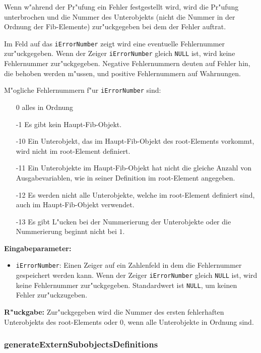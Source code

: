 Wenn w"ahrend der Pr"ufung ein Fehler festgestellt wird, wird die Pr"ufung unterbrochen und die Nummer des Unterobjekts (nicht die Nummer in der Ordnung der Fib-Elemente) zur"uckgegeben bei dem der Fehler auftrat.

Im Feld auf das \verb|iErrorNumber| zeigt wird eine eventuelle Fehlernummer zur"uckgegeben. Wenn der Zeiger \verb|iErrorNumber| gleich \verb|NULL| ist, wird keine Fehlernummer zur"uckgegeben. Negative Fehlernummern deuten auf Fehler hin, die behoben werden m"ussen, und positive Fehlernummern auf Wahrnungen.

\noindent
M"ogliche Fehlernummern f"ur \verb|iErrorNumber| sind:
\begin{itemize}
 \item [0] alles in Ordnung
 \item [-1] Es gibt kein Haupt-Fib-Objekt.
 \item [-10] Ein Unterobjekt, das im Haupt-Fib-Objekt des root-Elements vorkommt, wird nicht im root-Element definiert.
 \item [-11] Ein Unterobjekte im Haupt-Fib-Objekt hat nicht die gleiche Anzahl von Ausgabevariablen, wie in seiner Definition im root-Element angegeben.
 \item [-12] Es werden nicht alle Unterobjekte, welche im root-Element definiert sind, auch im Haupt-Fib-Objekt verwendet.
 \item [-13] Es gibt L"ucken bei der Nummerierung der Unterobjekte oder die Nummerierung beginnt nicht bei $1$.
\end{itemize}


\bigskip\noindent
\textbf{Eingabeparameter:}
\begin{itemize}
 \item \verb|iErrorNumber|: Einen Zeiger auf ein Zahlenfeld in dem die Fehlernummer gespeichert werden kann. Wenn der Zeiger \verb|iErrorNumber| gleich \verb|NULL| ist, wird keine Fehlernummer zur"uckgegeben. Standardwert ist \verb|NULL|, um keinen Fehler zur"uckzugeben.
\end{itemize}

\bigskip\noindent
\textbf{R"uckgabe:} Zur"uckgegeben wird die Nummer des ersten fehlerhaften Unterobjekts des root-Elements oder $0$, wenn alle Unterobjekte in Ordnung sind.


\subsubsection{generateExternSubobjectsDefinitions}

